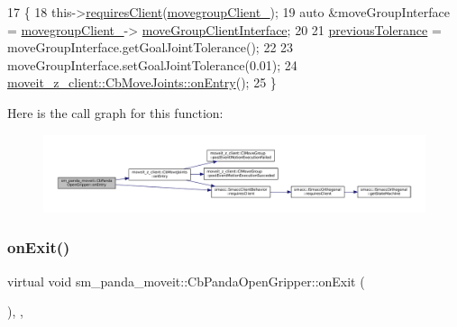 \begin{DoxyCode}
17     \{
18         this->\hyperlink{classsmacc_1_1SmaccClientBehavior_a917f001e763a1059af337bf4e164f542}{requiresClient}(\hyperlink{classmoveit__z__client_1_1CbMoveJoints_a2ce2e613b676025766dcd2f01ae50810}{movegroupClient\_});
19         \textcolor{keyword}{auto} &moveGroupInterface = \hyperlink{classmoveit__z__client_1_1CbMoveJoints_a2ce2e613b676025766dcd2f01ae50810}{movegroupClient\_}->
      \hyperlink{classmoveit__z__client_1_1ClMoveGroup_af86e046b837be0ef4afa9893d8808f20}{moveGroupClientInterface};
20 
21         \hyperlink{classsm__panda__moveit_1_1CbPandaOpenGripper_add6c758e01a2c484debb3ccf48e4597d}{previousTolerance} = moveGroupInterface.getGoalJointTolerance();
22 
23         moveGroupInterface.setGoalJointTolerance(0.01);
24         \hyperlink{classmoveit__z__client_1_1CbMoveJoints_a512e97e94ab05ee12837433e5d921095}{moveit\_z\_client::CbMoveJoints::onEntry}();
25     \}
\end{DoxyCode}
Here is the call graph for this function\+:
\nopagebreak
\begin{figure}[H]
\begin{center}
\leavevmode
\includegraphics[width=350pt]{classsm__panda__moveit_1_1CbPandaOpenGripper_ace4c87d312e8343fcf392f43956f954f_cgraph}
\end{center}
\end{figure}
\mbox{\label{classsm__panda__moveit_1_1CbPandaOpenGripper_a40378849466821989b11f0561945f8fe}} 
\subsubsection{\texorpdfstring{on\+Exit()}{onExit()}}
{\footnotesize\ttfamily virtual void sm\+\_\+panda\+\_\+moveit\+::\+Cb\+Panda\+Open\+Gripper\+::on\+Exit (\begin{DoxyParamCaption}{ }\end{DoxyParamCaption})\hspace{0.3cm}{\ttfamily [inline]}, {\ttfamily [override]}, {\ttfamily [virtual]}}



